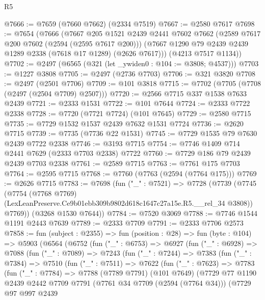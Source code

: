 \begin{lexlean}{R5}
\begin{coremodule}
@7666 := @7659 (@7660 @7662) (@2334 @7519)
@7667 := @2580 @7617
@7698 := @7654
    (@7666
      (@7667
        @205
        @1521
        @2439
        @2441
        @7602
        @7662
        (@2589 @7617 @200 @7602 (@2594 (@2595 @7617 @200)))
        (@7667 @1290 @79 @2439 @2439 @1289 @2338 (@7618 @17 @1289) (@2626 @7617)))
      (@4213 @7517 @1134))
@7702 := @2497 (@6565 (@321 (let _ywiden0 : @104 := @3808; @4537)))
@7703 := @1227 @3808
@7705 := @2497 (@2736 @7703)
@7706 := @321 @3820
@7708 := @2497 (@2501 @7706)
@7709 := @101 @3818
@7715 := @7702 (@7705 (@7708 (@2497 (@2504 @7709) @2507)))
@7720 := @2566 @7715 @337 @1538 @7633 @2439
@7721 := @2333 @1531
@7722 := @101 @7644
@7724 := @2333 @7722 @2338
@7728 := @7720 (@7721 @7724) (@101 @7645)
@7729 := @2580 @7715
@7735 := @7729 @1532 @1537 @2439 @7632 @1531 @7724
@7736 := @2620 @7715
@7739 := @7735 (@7736 @22 @1531)
@7745 := @7729 @1535 @79 @7630 @2439 @7722 @2338
@7746 := @3193 @7715
@7754 := @7746 @1409 @714 @2441 @7629 (@2333 @7703 @2338) @7722
@7760 := @7729 @186 @79 @2439 @2439 @7703 @2338
@7761 := @2589 @7715
@7763 := @7761 @175 @7703
@7764 := @2595 @7715
@7768 := @7760 (@7763 (@2594 (@7764 @175)))
@7769 := @2626 @7715
@7783 := @7698
    (fun ("_" : @7521) =>
    @7728
      (@7739
        (@7745
          (@7754
            (@7768 @7769)
            (LexLeanPreserve.Ce9b01ebb309b9802d618c1647c27a15e.R5.__rel_34 @3808))
          @7769))
      (@3268 @1530 @7644))
@7784 := @7520 @3069
@7788 := @7746 @1544 @1191 @2443 @7639
@7789 := @2333 @7709
@7791 := @2333 @7706 @2573
@7858 := fun (subject : @2355) =>
  fun (position : @28) =>
  fun (byte : @104) =>
  @5903
    (@6564
      (@6752
        (fun ("_" : @6753) =>
        @6927
          (fun ("_" : @6928) =>
          @7088
            (fun ("_" : @7089) =>
            @7243
              (fun ("_" : @7244) =>
              @7383
                (fun ("_" : @7384) =>
                @7510
                  (fun ("_" : @7511) =>
                  @7622
                    (fun ("_" : @7623) =>
                    @7783
                      (fun ("_" : @7784) =>
                      @7788
                        (@7789 @7791)
                        (@101 @7649)
                        (@7729
                          @77
                          @1190
                          @2439
                          @2442
                          @7709
                          @7791
                          (@7761 @34 @7709 (@2594 (@7764 @34)))
                          (@7729
                            @97
                            @997
                            @2439

\end{coremodule}
\end{lexlean}
